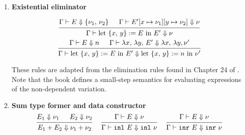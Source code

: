 \documentclass{article}
\begin{document}
\begin{enumerate}
  \item \textbf{Existential eliminator} \\
  \begin{spreadlines}{2em}
  \begin{gather*}
      \begin{prooftree}
        \hypo{\Gamma \vdash E \Downarrow \{\nu_1, \, \nu_2\}}
        \hypo{\Gamma \vdash E'[x \mapsto \nu_1][y \mapsto \nu_2] \Downarrow \nu}
        \infer2{\Gamma \vdash \text{let } \{x, \, y\} := E \text{ in } E' \Downarrow \nu}
      \end{prooftree}
      \\
      \begin{prooftree}
        \hypo{\Gamma \vdash E \Downarrow n}
        \hypo{\Gamma \vdash \lambda x, \, \lambda y, \, E' \Downarrow \lambda x, \, \lambda y, \nu'}
        \infer2{\Gamma \vdash \text{let } \{x, \, y\} := E \text{ in } E' \Downarrow
                \text{let } \{x, \, y\} := n \text{ in } \nu'}
      \end{prooftree}
    \end{gather*}
  \end{spreadlines}
    These rules are adapted from the elimination rules found
    in Chapter 24 of \cite{tapl}.
    Note that the book defines a small-step semantics for evaluating
    expressions of the non-dependent variation.


  \item \textbf{Sum type former and data constructor}
  \begin{gather*}
     \begin{prooftree}
      \hypo{E_1 \Downarrow \nu_1}
      \hypo{E_2 \Downarrow \nu_2}
      \infer2{E_1 + E_2 \Downarrow \nu_1 + \nu_2}
    \end{prooftree}
    ~ \quad
    \begin{prooftree}
      \hypo{\Gamma \vdash E \Downarrow \nu}
      \infer1{\Gamma \vdash \inl \,\, E \Downarrow \inl \,\, \nu}
    \end{prooftree}  
    ~ \quad
    \begin{prooftree}
     \hypo{\Gamma \vdash E \Downarrow \nu}
     \infer1{\Gamma \vdash \inr \,\,E \Downarrow \inr \, \, \nu}
    \end{prooftree}
  \end{gather*}


\end{enumerate}
\end{document}
